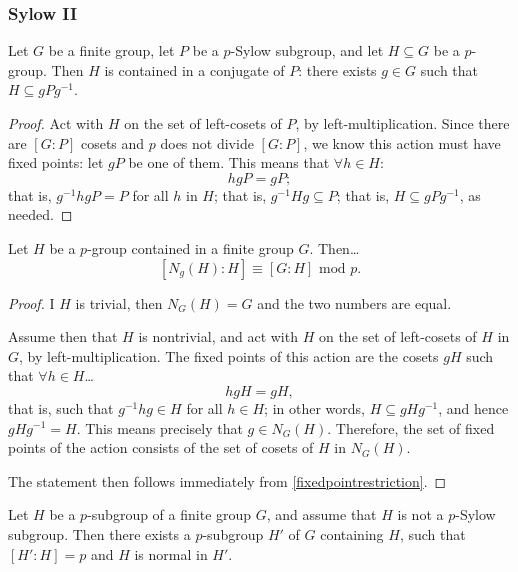 \subsubsection{Sylow II}\label{sylow2}

\begin{theorem}
\label{sylowthm2}
Let $G$ be a finite group, let $P$ be a $p$-Sylow subgroup, and let $H \subseteq G$ be a $p$-group. Then $H$ is contained
in a conjugate of $P$: there exists $g \in G$ such that $H \subseteq gPg^{-1}$.
\end{theorem}

\begin{proof}
Act with $H$ on the set of left-cosets of $P$, by left-multiplication. Since there are $[G : P]$ cosets and $p$ does not divide
$[G : P]$, we know this action must have fixed points: let $gP$ be one of them. This means that $\forall h \in H$:
$$hgP = gP;$$
that is, $g^{-1}hgP = P$ for all $h$ in $H$; that is, $g^{-1}Hg \subseteq P$; that is, $H \subseteq gPg^{-1}$, as needed.
\end{proof}

\begin{lemma}
Let $H$ be a $p$-group contained in a finite group $G$. Then\dots
$$[N_g(H) : H] \equiv [G : H] \textrm{ mod } p.$$
\end{lemma}

\begin{proof}
I $H$ is trivial, then $N_G(H) = G$ and the two numbers are equal.

Assume then that $H$ is nontrivial, and act with $H$ on the set of left-cosets of $H$ in $G$, by left-multiplication. The fixed points
of this action are the cosets $gH$ such that $\forall h \in H$\dots
$$hgH = gH,$$
that is, such that $g^{-1}hg \in H$ for all $h \in H$; in other words, $H \subseteq gHg^{-1}$, and hence $gHg^{-1} = H$. This means precisely that
$g \in N_G(H)$. Therefore, the set of fixed points of the action consists of the set of cosets of $H$ in $N_G(H)$.

The statement then follows immediately from \ref{fixedpointrestriction}.
\end{proof}

\begin{proposition}
Let $H$ be a $p$-subgroup of a finite group $G$, and assume that $H$ is not a $p$-Sylow subgroup. Then there exists a $p$-subgroup
$H'$ of $G$ containing $H$, such that $[H' : H] = p$ and $H$ is normal in $H'$.
\end{proposition}

